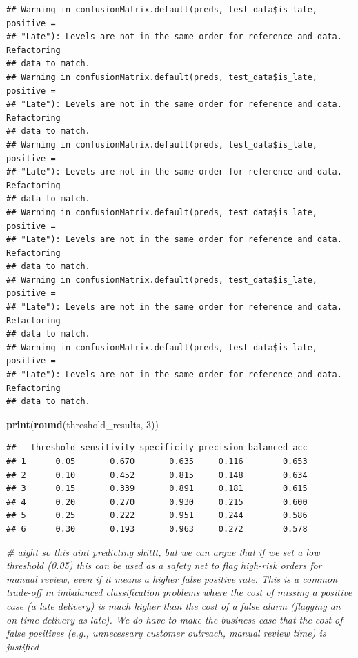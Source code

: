 \documentclass[
]{article}
\newenvironment{Shaded}{\begin{snugshade}}{\end{snugshade}}
\newcommand{\CommentTok}[1]{\textcolor[rgb]{0.56,0.35,0.01}{\textit{#1}}}
\newcommand{\DecValTok}[1]{\textcolor[rgb]{0.00,0.00,0.81}{#1}}
\newcommand{\FunctionTok}[1]{\textcolor[rgb]{0.13,0.29,0.53}{\textbf{#1}}}
\newcommand{\NormalTok}[1]{#1}
\begin{document}
\begin{verbatim}
## Warning in confusionMatrix.default(preds, test_data$is_late, positive =
## "Late"): Levels are not in the same order for reference and data. Refactoring
## data to match.
## Warning in confusionMatrix.default(preds, test_data$is_late, positive =
## "Late"): Levels are not in the same order for reference and data. Refactoring
## data to match.
## Warning in confusionMatrix.default(preds, test_data$is_late, positive =
## "Late"): Levels are not in the same order for reference and data. Refactoring
## data to match.
## Warning in confusionMatrix.default(preds, test_data$is_late, positive =
## "Late"): Levels are not in the same order for reference and data. Refactoring
## data to match.
## Warning in confusionMatrix.default(preds, test_data$is_late, positive =
## "Late"): Levels are not in the same order for reference and data. Refactoring
## data to match.
## Warning in confusionMatrix.default(preds, test_data$is_late, positive =
## "Late"): Levels are not in the same order for reference and data. Refactoring
## data to match.
\end{verbatim}

\begin{Shaded}
\begin{Highlighting}[]
\FunctionTok{print}\NormalTok{(}\FunctionTok{round}\NormalTok{(threshold\_results, }\DecValTok{3}\NormalTok{))}
\end{Highlighting}
\end{Shaded}

\begin{verbatim}
##   threshold sensitivity specificity precision balanced_acc
## 1      0.05       0.670       0.635     0.116        0.653
## 2      0.10       0.452       0.815     0.148        0.634
## 3      0.15       0.339       0.891     0.181        0.615
## 4      0.20       0.270       0.930     0.215        0.600
## 5      0.25       0.222       0.951     0.244        0.586
## 6      0.30       0.193       0.963     0.272        0.578
\end{verbatim}

\begin{Shaded}
\begin{Highlighting}[]
\CommentTok{\# aight so this aint predicting shittt, but we can argue that if we set a low threshold (0.05) this can be used as a safety net to flag high{-}risk orders for manual review, even if it means a higher false positive rate. This is a common trade{-}off in imbalanced classification problems where the cost of missing a positive case (a late delivery) is much higher than the cost of a false alarm (flagging an on{-}time delivery as late). We do have to make the business case that the cost of false positives (e.g., unnecessary customer outreach, manual review time) is justified}
\end{Highlighting}
\end{Shaded}
\end{document}

